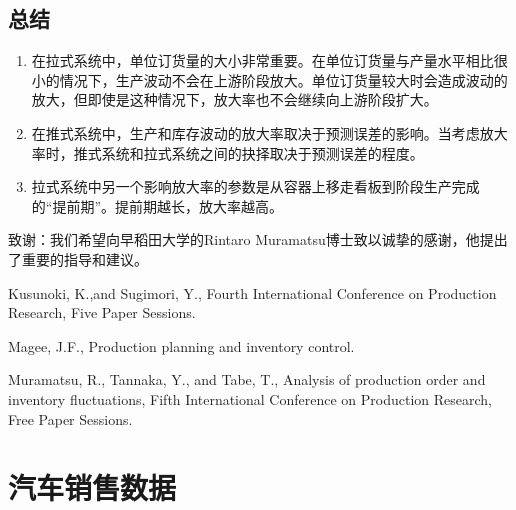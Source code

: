 \section{总结}

\begin{enumerate}
\item
在拉式系统中，单位订货量的大小非常重要。在单位订货量与产量水平相比很小的情况下，生产波动不会在上游阶段放大。单位订货量较大时会造成波动的放大，但即使是这种情况下，放大率也不会继续向上游阶段扩大。

\item
在推式系统中，生产和库存波动的放大率取决于预测误差的影响。当考虑放大率时，推式系统和拉式系统之间的抉择取决于预测误差的程度。

\item
拉式系统中另一个影响放大率的参数是从容器上移走看板到阶段生产完成的“提前期”。提前期越长，放大率越高。
\end{enumerate}


\nocite{ref1}
\nocite{ref2}
\nocite{ref3}



致谢：我们希望向早稻田大学的Rintaro Muramatsu博士致以诚挚的感谢，他提出了重要的指导和建议。

\begin{thebibliography}{99}

 Kusunoki, K.,and Sugimori, Y., Fourth International Conference on Production Research, Five Paper Sessions.

 Magee, J.F., Production planning and inventory control.

 Muramatsu, R., Tannaka, Y., and Tabe, T., Analysis of production order and inventory fluctuations, Fifth International Conference on Production Research, Free Paper Sessions.



\end{thebibliography}
















\chapter{汽车销售数据}

